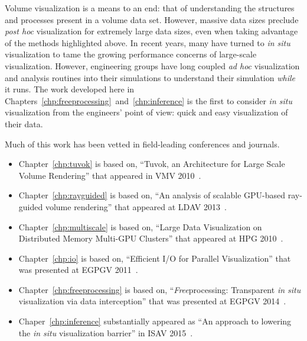 Volume visualization is a means to an end: that of understanding the
structures and processes present in a volume data set.  However,
massive data
sizes preclude \textit{post hoc} visualization for extremely large data
sizes, even when taking advantage of the methods highlighted above.  In
recent
years, many have turned to \textit{in situ} visualization to tame the
growing performance concerns of large-scale visualization.  However,
engineering groups have long coupled \textit{ad hoc} visualization and
analysis routines into their simulations to understand their simulation
\emph{while} it runs.  The work developed here in
Chapters~\ref{chp:freeprocessing}~and~\ref{chp:inference} is the first
to consider
\textit{in situ} visualization from the engineers' point of view: quick
and easy visualization of their data.

Much of this work has been vetted in field-leading conferences and
journals.
\begin{itemize}

  \item Chapter~\ref{chp:tuvok} is based on, ``Tuvok, an
  Architecture for Large Scale Volume Rendering'' that appeared in VMV
  2010~\cite{Fogal:2010:Tuvok}.

	\item Chapter~\ref{chp:rayguided} is based on, ``An analysis of scalable
	GPU-based ray-guided volume rendering'' that appeared at LDAV
	2013~\cite{Fogal:2013:Analysis}.

  \item Chapter~\ref{chp:multiscale} is based on, ``Large Data
  Visualization on Distributed Memory Multi-GPU Clusters'' that
  appeared at HPG 2010~\cite{Fogal:2010:HPG}.

  \item Chapter~\ref{chp:io} is based on, ``Efficient I/O
  for Parallel Visualization'' that was presented at EGPGV
  2011~\cite{Fogal:2011:PracticalIO}.

	\item Chapter~\ref{chp:freeprocessing} is based on,
	``\textit{Free}processing: Transparent \textit{in situ} visualization via
	data interception'' that was presented at EGPGV
	2014~\cite{Fogal:2014:Freeprocessing}.

  \item Chaper~\ref{chp:inference} substantially appeared as ``An
  approach to lowering the \textit{in situ} visualization barrier'' in
  ISAV 2015~\cite{Fogal:2015:InSitu}.

\end{itemize}

